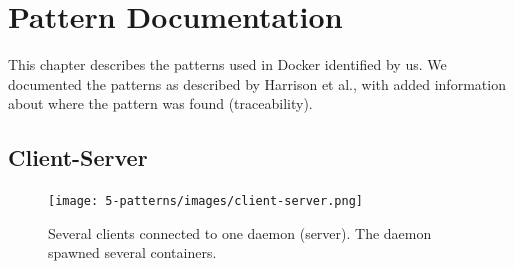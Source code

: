 
\clearpage
\chapter{Pattern Documentation}
\label{ch:patterns}
This chapter describes the patterns used in Docker identified by us. We documented the patterns as described by Harrison et al.\cite{usingpatternscapture}, with added information about where the pattern was found (traceability).

\section{Client-Server}
\begin{figure}[H]
\centering
\texttt{[image: 5-patterns/images/client-server.png]}
\caption{Several clients connected to one daemon (server). The daemon spawned several containers.}
\label{fig:clientserver-pattern}
\end{figure}

